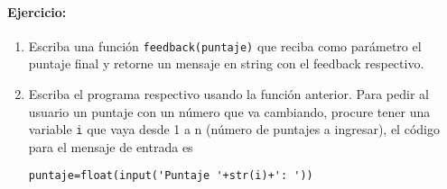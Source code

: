 \paragraph{Ejercicio:} \begin{enumerate}
    \item Escriba una función \texttt{feedback(puntaje)} que reciba como parámetro el puntaje final y retorne un mensaje en string con el feedback respectivo. 
    \item Escriba el programa respectivo usando la función anterior. Para pedir al usuario un puntaje con un número que va cambiando, procure tener una variable \texttt{i} que vaya desde 1 a n (número de puntajes a ingresar), el código para el mensaje de entrada es
    \begin{lstlisting}[style=consola]
puntaje=float(input('Puntaje '+str(i)+': '))
    \end{lstlisting}
\end{enumerate}